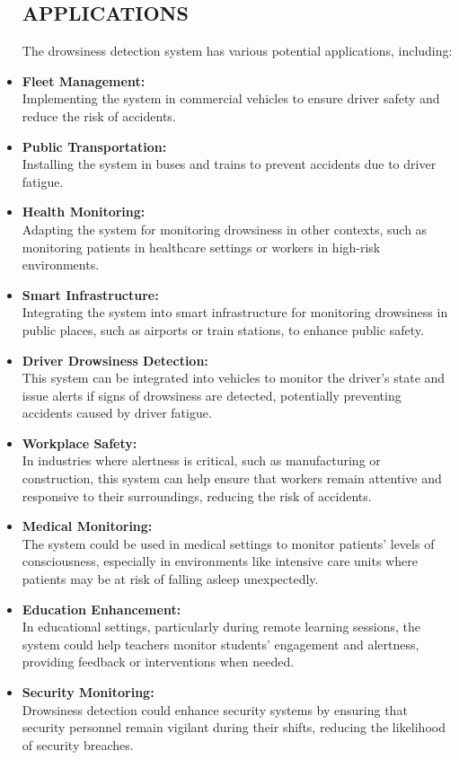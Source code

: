 \documentclass[12pt]{article}
\begin{document}
\begin{itemize}
\subsection{APPLICATIONS }
The drowsiness detection system has various potential applications, including:\\
\item \textbf{Fleet Management:}\\ Implementing the system in commercial vehicles to ensure driver safety and reduce the risk of accidents.
\item \textbf{Public Transportation:}\\ Installing the system in buses and trains to prevent accidents due to driver fatigue.
\item \textbf{Health Monitoring:}\\ Adapting the system for monitoring drowsiness in other contexts, such as monitoring patients in healthcare settings or workers in high-risk environments.
\item \textbf{Smart Infrastructure:}\\ Integrating the system into smart infrastructure for monitoring drowsiness in public places, such as airports or train stations, to enhance public safety.
\item \textbf{Driver Drowsiness Detection:}\\ This system can be integrated into vehicles to monitor the driver's state and issue alerts if signs of drowsiness are detected, potentially preventing accidents caused by driver fatigue.
\item \textbf{Workplace Safety:}\\ In industries where alertness is critical, such as manufacturing or construction, this system can help ensure that workers remain attentive and responsive to their surroundings, reducing the risk of accidents.
\item \textbf{Medical Monitoring:}\\ The system could be used in medical settings to monitor patients' levels of consciousness, especially in environments like intensive care units where patients may be at risk of falling asleep unexpectedly.
\item \textbf{Education Enhancement:}\\ In educational settings, particularly during remote learning sessions, the system could help teachers monitor students' engagement and alertness, providing feedback or interventions when needed.
\item \textbf{Security Monitoring:}\\ Drowsiness detection could enhance security systems by ensuring that security personnel remain vigilant during their shifts, reducing the likelihood of security breaches.

\end{itemize}
\end{document}
